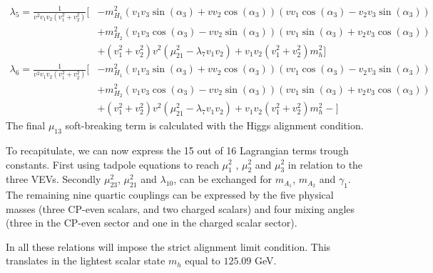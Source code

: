 %
\begin{equation}
\begin{split}
\lambda_5 = \frac{1}{v^2 v_1 v_2 \left(v_1^2+v_2^2\right)} \Bigg[ 
& -m_{H_1}^2 \left(v_1 v_3 \sin (\alpha_3) + v v_2 \cos (\alpha_3)\right) \left(v v_1 \cos (\alpha_3)-v_2 v_3  \sin (\alpha_3)\right) \\ & + m_{H_2}^2 \left(v_1 v_3 \cos (\alpha_3)  -v v_2 \sin (\alpha_3)\right) \left(v v_1 \sin (\alpha_3) + v_2 v_3 \cos (\alpha_3)\right) \\ & +\left(v_1^2+v_2^2\right) v^2 \left(\mu_{21}^2-\lambda_7 v_1 v_2\right) + v_1 v_2 \left(v_1^2+v_2^2\right) m_h^2 \Bigg]   
\end{split} 
\end{equation}
%
\begin{equation}
\begin{split}
\lambda_6 = \frac{1}{v^2 v_1 v_2 \left(v_1^2+v_2^2\right)} \Bigg[ &- m_{H_1}^2 \left(v_1 v_3 \sin (\alpha_3)+v v_2 \cos (\alpha_3)\right) \left(v v_1 \cos (\alpha_3)-v_2 v_3 \sin (\alpha_3)\right)  \\ & +  m_{H_2}^2 \left(v_1 v_3 \cos (\alpha_3) -v v_2 \sin (\alpha_3)\right) \left(v v_1 \sin (\alpha_3)+v_2 v_3 \cos (\alpha_3)\right) \\ & +\left(v_1^2+v_2^2\right) v^2 \left(\mu_{21}^2-\lambda_7 v_1 v_2\right) + v_1 v_2 \left(v_1^2+v_2^2\right) m_h^2- \Bigg] 
\end{split} 
\end{equation}
%
The final $\mu_{13}$ soft-breaking term is calculated with the Higgs alignment condition. 

To recapitulate, we can now express the 15 out of 16 Lagrangian terms trough constants. 
%
First using tadpole equations to reach $\mu_{1}^2$ , $\mu_{2}^2$ and $\mu_{3}^2$ in relation to the three VEVs. Secondly $\mu_{23}^2$, $\mu_{21}^2$ and $\lambda_{10}$, can be exchanged for $m_{A_1}$, $m_{A_2}$ and $\gamma_1$. 
%
The remaining nine quartic couplings can be expressed by the five physical masses (three CP-even scalars, and two charged scalars) and four mixing angles (three in the CP-even sector and one in the charged scalar sector). 

In all these relations will impose the strict alignment limit condition. This translates in the lightest scalar state $m_h$ equal to $125.09$ GeV.
%

